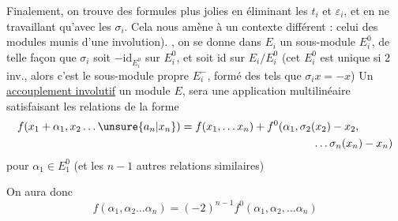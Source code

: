 Finalement, on trouve des formules plus jolies en éliminant les $t_i$ et $\varepsilon_i$, et en ne travaillant qu'avec les $\sigma_i$. Cela nous amène à un contexte différent : celui des  modules  munis d'une involution). , on se donne dans $E_i$ un sous-module $E_i^0$, de telle façon que $\sigma_i$ soit $-\mathrm{id}_{E_i^0}$ sur $E_i^0$, et soit id sur $E_i/E_i^0$ (cet $E_i^0$ est  unique  si $2$ inv., alors c'est le sous-module propre $E_i^-$, formé des  tels que $\sigma_i x=-x$) Un \uline{accouplement involutif}   un module $E$, sera une application multilinéaire
satisfaisant les relations de la forme
\[
 \begin{aligned}
 f(x_1+\alpha_1,x_2\ldots \unsure{a_n|x_n})&=f(x_1,\ldots x_n)+f^0(\alpha_1,\sigma_2(x_2)-x_2,\\
 &\hspace{12em}\ldots\sigma_n(x_n)-x_n)
 \end{aligned}
\]
pour $\alpha_1\in E_1^0$ (et les $n-1$ autres relations similaires)

On aura donc
\[
 f(\alpha_1,\alpha_2\ldots\alpha_n)=(-2)^{n-1}f^0(\alpha_1,\alpha_2,\ldots\alpha_n)
\]

